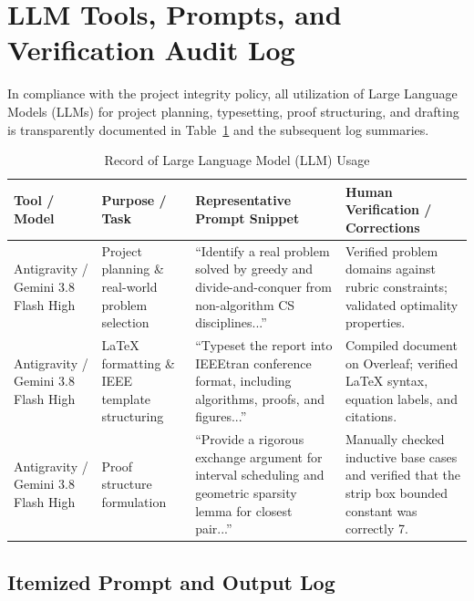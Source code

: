 \section{LLM Tools, Prompts, and Verification Audit Log}
\label{app:llm}

In compliance with the project integrity policy, all utilization of Large Language Models (LLMs) for project planning, typesetting, proof structuring, and drafting is transparently documented in Table~\ref{tab:llm_log} and the subsequent log summaries.

\begin{table}[t]
\centering
\caption{Record of Large Language Model (LLM) Usage}
\label{tab:llm_log}
\begin{tabular}{p{2.5cm}p{4cm}p{5cm}p{4.5cm}}
\toprule
\textbf{Tool / Model} & \textbf{Purpose / Task} & \textbf{Representative Prompt Snippet} & \textbf{Human Verification / Corrections} \\
\midrule
Antigravity / Gemini 3.8 Flash High & Project planning \& real-world problem selection & ``Identify a real problem solved by greedy and divide-and-conquer from non-algorithm CS disciplines...'' & Verified problem domains against rubric constraints; validated optimality properties. \\
\addlinespace
Antigravity / Gemini 3.8 Flash High & LaTeX formatting \& IEEE template structuring & ``Typeset the report into IEEEtran conference format, including algorithms, proofs, and figures...'' & Compiled document on Overleaf; verified LaTeX syntax, equation labels, and citations. \\
\addlinespace
Antigravity / Gemini 3.8 Flash High & Proof structure formulation & ``Provide a rigorous exchange argument for interval scheduling and geometric sparsity lemma for closest pair...'' & Manually checked inductive base cases and verified that the strip box bounded constant was correctly 7. \\
\bottomrule
\end{tabular}
\end{table}

\subsection{Itemized Prompt and Output Log}

